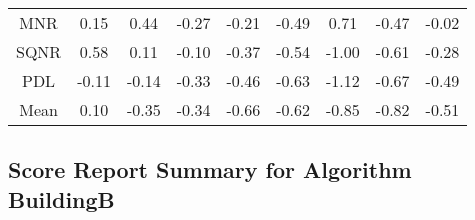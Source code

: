 \begin{longtable}{ | c || c | c | c | c | c | c | c || c |}
MNR &  \cellcolor[HTML]{FFFFFF} 0.15 &  \cellcolor[HTML]{F7F7FF} 0.44 &  \cellcolor[HTML]{FFF7F7} -0.27 &  \cellcolor[HTML]{FFF7F7} -0.21 &  \cellcolor[HTML]{FFEFEF} -0.49 &  \cellcolor[HTML]{EFEFFF} 0.71 &  \cellcolor[HTML]{FFF7F7} -0.47 &  \cellcolor[HTML]{FFFFFF} -0.02 \\
SQNR &  \cellcolor[HTML]{EFEFFF} 0.58 &  \cellcolor[HTML]{FFFFFF} 0.11 &  \cellcolor[HTML]{FFFFFF} -0.10 &  \cellcolor[HTML]{FFF7F7} -0.37 &  \cellcolor[HTML]{FFEFEF} -0.54 &  \cellcolor[HTML]{FFE7E7} -1.00 &  \cellcolor[HTML]{FFEFEF} -0.61 &  \cellcolor[HTML]{FFF7F7} -0.28 \\
PDL &  \cellcolor[HTML]{FFFFFF} -0.11 &  \cellcolor[HTML]{FFFFFF} -0.14 &  \cellcolor[HTML]{FFF7F7} -0.33 &  \cellcolor[HTML]{FFF7F7} -0.46 &  \cellcolor[HTML]{FFEFEF} -0.63 &  \cellcolor[HTML]{FFDFDF} -1.12 &  \cellcolor[HTML]{FFEFEF} -0.67 &  \cellcolor[HTML]{FFEFEF} -0.49 \\
\hline
\hline
Mean  &  \cellcolor[HTML]{FFFFFF} 0.10 &  \cellcolor[HTML]{FFF7F7} -0.35 &  \cellcolor[HTML]{FFF7F7} -0.34 &  \cellcolor[HTML]{FFEFEF} -0.66 &  \cellcolor[HTML]{FFEFEF} -0.62 &  \cellcolor[HTML]{FFE7E7} -0.85 &  \cellcolor[HTML]{FFE7E7} -0.82 &  \cellcolor[HTML]{FFEFEF} -0.51 \\
\hline
\end{longtable}

\subsection*{Score Report Summary for Algorithm BuildingB}

